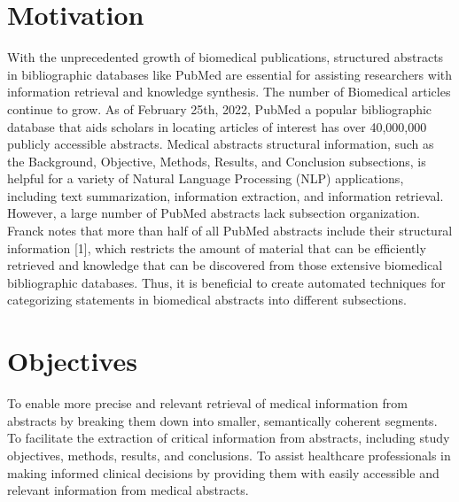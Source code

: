 \documentclass[12pt,a4paper]{report}     %
\begin{document}
\begin{normalsize}
\section{Motivation}
{\setlength{\baselineskip}{1.1\baselineskip}
With the unprecedented growth of biomedical publications, structured abstracts in bibliographic databases  like PubMed are essential for assisting researchers with information retrieval and knowledge synthesis.
The number of Biomedical articles continue to grow. As of February 25th, 2022, PubMed a popular bibliographic database that aids scholars in locating articles of interest has over 40,000,000 publicly accessible abstracts. Medical abstracts structural information, such as the Background, Objective, Methods, Results, and Conclusion subsections, is helpful for a variety of Natural Language Processing (NLP) applications, including text summarization, information extraction, and information retrieval. However, a large number of PubMed abstracts lack subsection organization. Franck notes that more than half of all PubMed abstracts include their structural information [1], which restricts the amount of material that can be efficiently retrieved and knowledge that can be discovered from those extensive biomedical bibliographic databases. Thus, it is beneficial to create automated techniques for categorizing statements in biomedical abstracts into different subsections.
\par}	

\section{Objectives}
{\setlength{\baselineskip}{1.1\baselineskip}
To enable more precise and relevant retrieval of medical information from abstracts by breaking them down into smaller, semantically coherent segments.
To facilitate the extraction of critical information from abstracts, including study objectives, methods, results, and conclusions. 
To assist healthcare professionals in making informed clinical decisions by providing them with easily accessible and relevant information from medical abstracts.
}

\end{normalsize}
\end{document}
